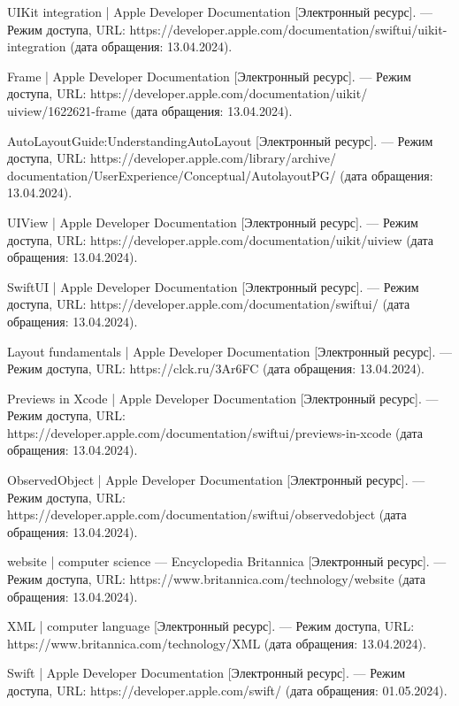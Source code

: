 \begin{thebibliography}{}
	UIKit integration | Apple Developer Documentation [Электронный ресурс]. --- Режим доступа, URL: https://developer.apple.com/documentation/swiftui/uikit-integration (дата обращения: 13.04.2024).
	
	Frame | Apple Developer Documentation [Электронный ресурс]. --- Режим доступа, URL: https://developer.apple.com/documentation/uikit/ uiview/1622621-frame (дата обращения: 13.04.2024).
	
	AutoLayoutGuide:UnderstandingAutoLayout [Электронный ресурс]. --- Режим доступа, URL: https://developer.apple.com/library/archive/ documentation/UserExperience/Conceptual/AutolayoutPG/ (дата обращения: 13.04.2024).
	
	UIView | Apple Developer Documentation [Электронный ресурс]. --- Режим доступа, URL: https://developer.apple.com/documentation/uikit/uiview (дата обращения: 13.04.2024).
	
	SwiftUI | Apple Developer Documentation [Электронный ресурс]. --- Режим доступа, URL: https://developer.apple.com/documentation/swiftui/ (дата обращения: 13.04.2024).
	
	Layout fundamentals | Apple Developer Documentation [Электронный ресурс]. --- Режим доступа, URL: https://clck.ru/3Ar6FC (дата обращения: 13.04.2024).
	
	Previews in Xcode | Apple Developer Documentation [Электронный ресурс]. --- Режим доступа, URL: https://developer.apple.com/documentation/swiftui/previews-in-xcode (дата обращения: 13.04.2024).
	
	ObservedObject | Apple Developer Documentation [Электронный ресурс]. --- Режим доступа, URL: https://developer.apple.com/documentation/swiftui/observedobject (дата обращения: 13.04.2024).
	
	website | computer science --- Encyclopedia Britannica [Электронный ресурс]. --- Режим доступа, URL: https://www.britannica.com/technology/website (дата обращения: 13.04.2024).
	
	XML | computer language [Электронный ресурс]. --- Режим доступа, URL: https://www.britannica.com/technology/XML (дата обращения: 13.04.2024).
	
	Swift | Apple Developer Documentation  [Электронный ресурс]. --- Режим доступа, URL: https://developer.apple.com/swift/ (дата обращения: 01.05.2024).
	

\end{thebibliography}
